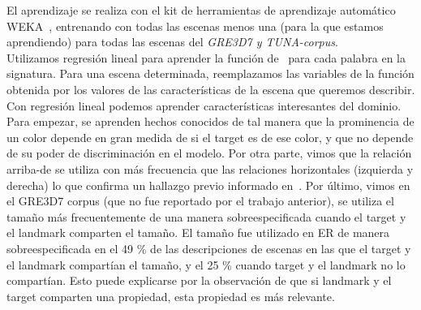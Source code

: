 

El aprendizaje se realiza con el kit de herramientas de aprendizaje autom\'atico
WEKA~\cite{Hall:WEK09}, entrenando con todas las escenas menos una (para la que estamos aprendiendo) para todas las escenas del \textit{GRE3D7 y TUNA-corpus}. \\

Utilizamos regresi\'on lineal para aprender la funci\'on de
\puse\ para cada palabra en la signatura. Para una escena determinada, reemplazamos
las variables de la funci\'on obtenida por los valores de las caracter\'{i}sticas
de la escena que queremos describir.\\

Con regresi\'on lineal podemos aprender caracter\'{i}sticas interesantes
 del dominio. Para empezar, se aprenden hechos conocidos
de tal manera que la prominencia de un color depende en gran medida de si el
target es de ese color, y que no depende de su
poder de discriminaci\'on en el modelo. Por otra parte, vimos que la relaci\'on arriba-de
 se utiliza con m\'as frecuencia que las relaciones horizontales
(izquierda y derecha) lo que confirma un hallazgo previo informado
en~\cite{viet:gene11}. Por \'ultimo, vimos en el
GRE3D7 corpus (que no fue reportado por el trabajo anterior), se utiliza el tama\~no
m\'as frecuentemente de una manera sobreespecificada cuando el
target y el landmark comparten el tama\~no. El tama\~no fue utilizado en ER de manera sobreespecificada en el 49 \% de
las descripciones de escenas en las que el target y el landmark compart\'ian el tama\~no,
y el 25 \% cuando target y el landmark no lo compart\'ian. Esto puede explicarse por la observaci\'on de que si landmark y el target comparten una propiedad, esta propiedad es m\'as relevante.

